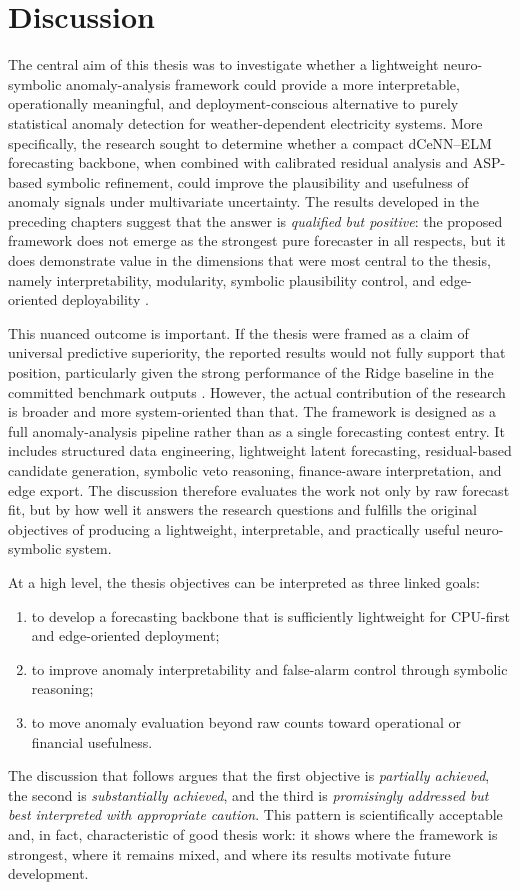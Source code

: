 \section{Discussion}
\label{sec:discussion}

The central aim of this thesis was to investigate whether a lightweight neuro-symbolic anomaly-analysis framework could provide a more interpretable, operationally meaningful, and deployment-conscious alternative to purely statistical anomaly detection for weather-dependent electricity systems. More specifically, the research sought to determine whether a compact dCeNN--ELM forecasting backbone, when combined with calibrated residual analysis and ASP-based symbolic refinement, could improve the plausibility and usefulness of anomaly signals under multivariate uncertainty. The results developed in the preceding chapters suggest that the answer is \emph{qualified but positive}: the proposed framework does not emerge as the strongest pure forecaster in all respects, but it does demonstrate value in the dimensions that were most central to the thesis, namely interpretability, modularity, symbolic plausibility control, and edge-oriented deployability \cite{repo_thesis_grid_anomaly}.

This nuanced outcome is important. If the thesis were framed as a claim of universal predictive superiority, the reported results would not fully support that position, particularly given the strong performance of the Ridge baseline in the committed benchmark outputs \cite{repo_thesis_grid_anomaly}. However, the actual contribution of the research is broader and more system-oriented than that. The framework is designed as a full anomaly-analysis pipeline rather than as a single forecasting contest entry. It includes structured data engineering, lightweight latent forecasting, residual-based candidate generation, symbolic veto reasoning, finance-aware interpretation, and edge export. The discussion therefore evaluates the work not only by raw forecast fit, but by how well it answers the research questions and fulfills the original objectives of producing a lightweight, interpretable, and practically useful neuro-symbolic system.

At a high level, the thesis objectives can be interpreted as three linked goals:
\begin{enumerate}
	\item to develop a forecasting backbone that is sufficiently lightweight for CPU-first and edge-oriented deployment;
	\item to improve anomaly interpretability and false-alarm control through symbolic reasoning;
	\item to move anomaly evaluation beyond raw counts toward operational or financial usefulness.
\end{enumerate}
The discussion that follows argues that the first objective is \emph{partially achieved}, the second is \emph{substantially achieved}, and the third is \emph{promisingly addressed but best interpreted with appropriate caution}. This pattern is scientifically acceptable and, in fact, characteristic of good thesis work: it shows where the framework is strongest, where it remains mixed, and where its results motivate future development.

